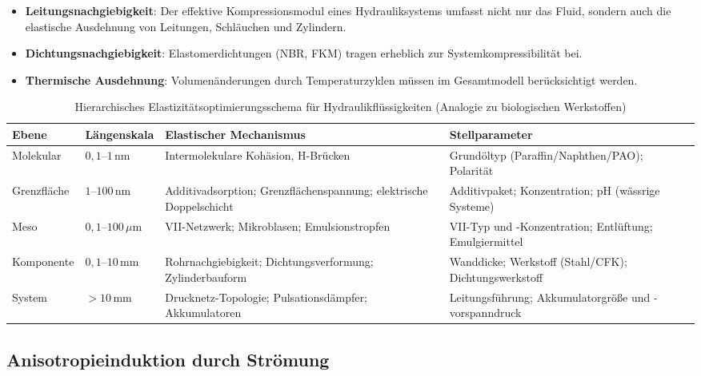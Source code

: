 ﻿\documentclass[a4paper,12pt]{scrreprt}
\theoremstyle{definition}
\begin{document}
\begin{itemize}
  \item \textbf{Leitungsnachgiebigkeit}: Der effektive Kompressionsmodul
    eines Hydrauliksystems umfasst nicht nur das Fluid, sondern auch die
    elastische Ausdehnung von Leitungen, Schläuchen und Zylindern.
  \item \textbf{Dichtungsnachgiebigkeit}: Elastomerdichtungen (NBR, FKM)
    tragen erheblich zur Systemkompressibilität bei.
  \item \textbf{Thermische Ausdehnung}: Volumenänderungen durch
    Temperaturzyklen müssen im Gesamtmodell berücksichtigt werden.
\end{itemize}

\begin{table}[H]
  \centering
  \caption{Hierarchisches Elastizitätsoptimierungsschema für Hydraulikflüssigkeiten
    (Analogie zu biologischen Werkstoffen)}
  \label{tab:hierarchie_hydraulik}
  \begin{tabular}{p{2.5cm}p{3.2cm}p{4.0cm}p{3.8cm}}
    \toprule
    \textbf{Ebene} & \textbf{Längenskala} & \textbf{Elastischer Mechanismus}
      & \textbf{Stellparameter} \\
    \midrule
    Molekular    & $0{,}1$--$1\,\mathrm{nm}$
      & Intermolekulare Kohäsion, H-Brücken
      & Grundöltyp (Paraffin/Naphthen/PAO); Polarität \\
    \midrule
    Grenzfläche  & $1$--$100\,\mathrm{nm}$
      & Additivadsorption; Grenzflächenspannung; elektrische Doppelschicht
      & Additivpaket; Konzentration; pH (wässrige Systeme) \\
    \midrule
    Meso         & $0{,}1$--$100\,\mu\mathrm{m}$
      & VII-Netzwerk; Mikroblasen; Emulsionstropfen
      & VII-Typ und -Konzentration; Entlüftung; Emulgiermittel \\
    \midrule
    Komponente   & $0{,}1$--$10\,\mathrm{mm}$
      & Rohrnachgiebigkeit; Dichtungsverformung; Zylinderbauform
      & Wanddicke; Werkstoff (Stahl/CFK); Dichtungswerkstoff \\
    \midrule
    System       & $> 10\,\mathrm{mm}$
      & Drucknetz-Topologie; Pulsationsdämpfer; Akkumulatoren
      & Leitungsführung; Akkumulatorgröße und -vorspanndruck \\
    \bottomrule
  \end{tabular}
\end{table}

\subsection{Anisotropieinduktion durch Strömung}
\end{document}
